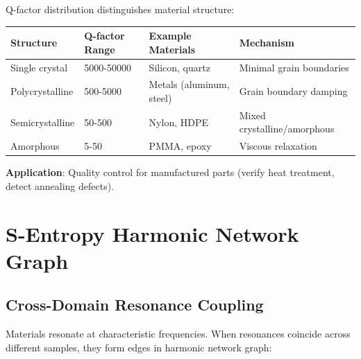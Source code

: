 \documentclass[12pt,a4paper]{article}
\begin{document}
Q-factor distribution distinguishes material structure:

\begin{center}
\begin{tabular}{|l|l|l|l|}
\hline
\textbf{Structure} & \textbf{Q-factor Range} & \textbf{Example Materials} & \textbf{Mechanism} \\
\hline
Single crystal & 5000-50000 & Silicon, quartz & Minimal grain boundaries \\
Polycrystalline & 500-5000 & Metals (aluminum, steel) & Grain boundary damping \\
Semicrystalline & 50-500 & Nylon, HDPE & Mixed crystalline/amorphous \\
Amorphous & 5-50 & PMMA, epoxy & Viscous relaxation \\
\hline
\end{tabular}
\end{center}

\textbf{Application}: Quality control for manufactured parts (verify heat treatment, detect annealing defects).

\section{S-Entropy Harmonic Network Graph}

\subsection{Cross-Domain Resonance Coupling}

Materials resonate at characteristic frequencies. When resonances coincide across different samples, they form edges in harmonic network graph:

\begin{center}
\end{center}
\end{document}
